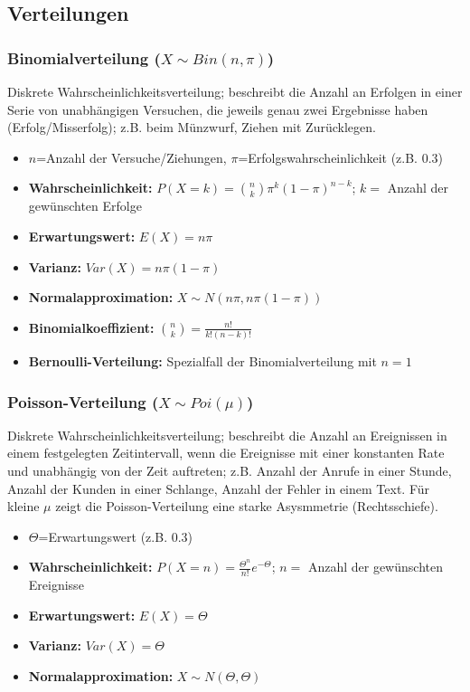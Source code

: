 \subsection{Verteilungen}

\subsubsection{Binomialverteilung (\(X\sim Bin(n,\pi)\))}
Diskrete Wahrscheinlichkeitsverteilung; beschreibt die Anzahl an Erfolgen in einer Serie von unabhängigen Versuchen, die jeweils genau zwei Ergebnisse haben (Erfolg/Misserfolg); z.B. beim Münzwurf, Ziehen mit Zurücklegen.

\begin{itemize}
    \item \(n\)=Anzahl der Versuche/Ziehungen, \(\pi\)=Erfolgswahrscheinlichkeit (z.B. \(0.3\))
    \item \textbf{Wahrscheinlichkeit:} \(P(X=k)=\binom{n}{k}\pi^k(1-\pi)^{n-k}\); \(k=\) Anzahl der gewünschten Erfolge
    \item \textbf{Erwartungswert:} \(E(X)=n\pi\)
    \item \textbf{Varianz:} \(Var(X)=n\pi(1-\pi)\)
    \item \textbf{Normalapproximation:} \(X\sim N(n\pi, n\pi(1-\pi))\)
    \item \textbf{Binomialkoeffizient:} \(\binom{n}{k}=\frac{n!}{k!(n-k)!}\)
    \item \textbf{Bernoulli-Verteilung:} Spezialfall der Binomialverteilung mit \(n=1\)
\end{itemize}


\subsubsection{Poisson-Verteilung (\(X\sim Poi(\mu)\))}
Diskrete Wahrscheinlichkeitsverteilung; beschreibt die Anzahl an Ereignissen in einem festgelegten Zeitintervall, wenn die Ereignisse mit einer konstanten Rate und unabhängig von der Zeit auftreten; z.B. Anzahl der Anrufe in einer Stunde, Anzahl der Kunden in einer Schlange, Anzahl der Fehler in einem Text. Für kleine \(\mu\) zeigt die Poisson-Verteilung eine starke Asysmmetrie (Rechtsschiefe).

\begin{itemize}
    \item \(\varTheta \)=Erwartungswert (z.B. \(0.3\))
    \item \textbf{Wahrscheinlichkeit:} \(P(X=n)=\frac{\varTheta^n}{n!}e^{-\varTheta}\); \(n=\) Anzahl der gewünschten Ereignisse
    \item \textbf{Erwartungswert:} \(E(X)=\varTheta\)
    \item \textbf{Varianz:} \(Var(X)=\varTheta\)
    \item \textbf{Normalapproximation:} \(X\sim N(\varTheta, \varTheta)\)
\end{itemize}


